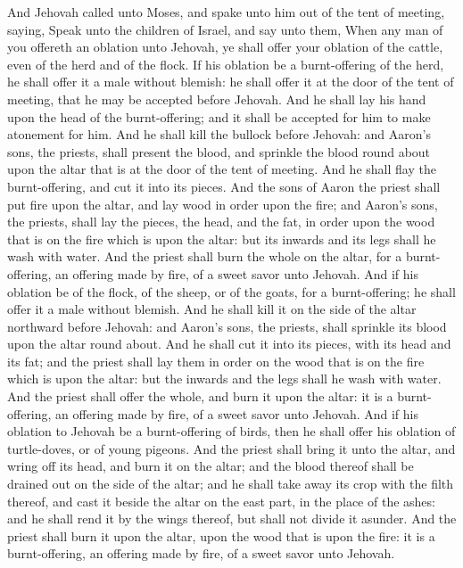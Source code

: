 


And Jehovah called unto Moses, and spake unto him out of the tent of meeting, saying, Speak unto the children of Israel, and say unto them, When any man of you offereth an oblation unto Jehovah, ye shall offer your oblation of the cattle, even of the herd and of the flock.  If his oblation be a burnt-offering of the herd, he shall offer it a male without blemish: he shall offer it at the door of the tent of meeting, that he may be accepted before Jehovah. And he shall lay his hand upon the head of the burnt-offering; and it shall be accepted for him to make atonement for him. And he shall kill the bullock before Jehovah: and Aaron’s sons, the priests, shall present the blood, and sprinkle the blood round about upon the altar that is at the door of the tent of meeting. And he shall flay the burnt-offering, and cut it into its pieces. And the sons of Aaron the priest shall put fire upon the altar, and lay wood in order upon the fire; and Aaron’s sons, the priests, shall lay the pieces, the head, and the fat, in order upon the wood that is on the fire which is upon the altar: but its inwards and its legs shall he wash with water. And the priest shall burn the whole on the altar, for a burnt-offering, an offering made by fire, of a sweet savor unto Jehovah.  And if his oblation be of the flock, of the sheep, or of the goats, for a burnt-offering; he shall offer it a male without blemish. And he shall kill it on the side of the altar northward before Jehovah: and Aaron’s sons, the priests, shall sprinkle its blood upon the altar round about. And he shall cut it into its pieces, with its head and its fat; and the priest shall lay them in order on the wood that is on the fire which is upon the altar: but the inwards and the legs shall he wash with water. And the priest shall offer the whole, and burn it upon the altar: it is a burnt-offering, an offering made by fire, of a sweet savor unto Jehovah.  And if his oblation to Jehovah be a burnt-offering of birds, then he shall offer his oblation of turtle-doves, or of young pigeons. And the priest shall bring it unto the altar, and wring off its head, and burn it on the altar; and the blood thereof shall be drained out on the side of the altar; and he shall take away its crop with the filth thereof, and cast it beside the altar on the east part, in the place of the ashes: and he shall rend it by the wings thereof, but shall not divide it asunder. And the priest shall burn it upon the altar, upon the wood that is upon the fire: it is a burnt-offering, an offering made by fire, of a sweet savor unto Jehovah. 

